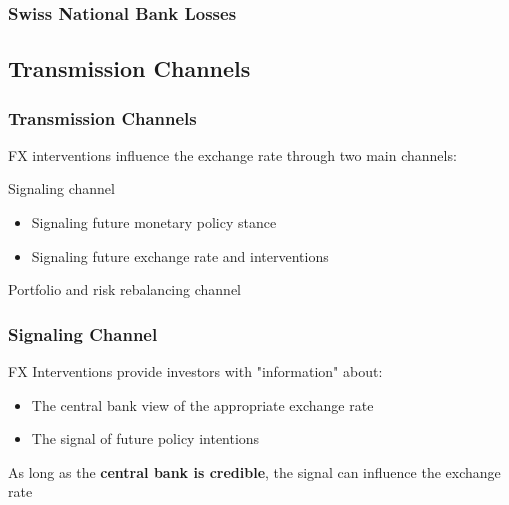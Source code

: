 \documentclass{beamer}
\newenvironment{wideitemize}{\itemize\addtolength{\itemsep}{10pt}}{\enditemize}
\newenvironment{wideenumerate}{\enumerate\addtolength{\itemsep}{10pt}}{\endenumerate}
\begin{document}
\begin{frame}
\frametitle{Swiss National Bank Losses}
\end{frame}


\subsection{Transmission Channels}
\begin{frame}
  \frametitle{Transmission Channels}

  FX interventions influence the exchange rate through two main channels:\\

  \begin{wideenumerate}
  \item Signaling channel
    \begin{itemize}
    \item Signaling future monetary policy stance
    \item Signaling future exchange rate and interventions
    \end{itemize}
  \item Portfolio and risk rebalancing channel    
    \end{wideenumerate}    
\end{frame}


\begin{frame}
  \frametitle{Signaling Channel}
  \begin{wideitemize}
  \item FX Interventions provide investors with "information" about:
    \begin{itemize}
    \item The central bank view of the appropriate exchange rate
    \item The signal of future policy intentions
    \end{itemize}
    
  \item As long as the \textbf{central bank is credible}, the signal can influence the exchange rate
  \end{wideitemize}  
\end{frame}
\end{document}
